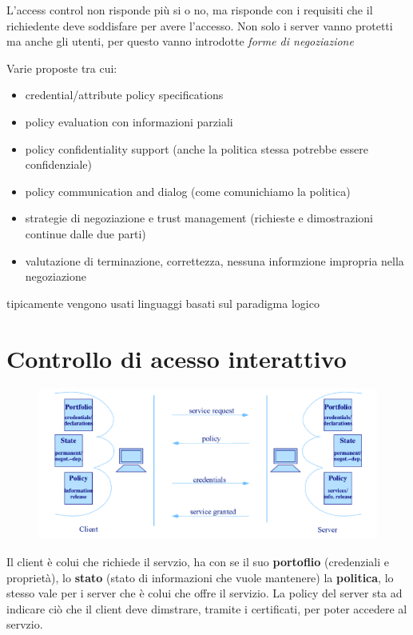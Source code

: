 \documentclass{report}
\begin{document}
L'access control non risponde più si o no, ma risponde con i requisiti che il richiedente deve soddisfare per avere l'accesso.
Non solo i server vanno protetti ma anche gli utenti, per questo vanno introdotte \textit{forme di negoziazione}

Varie proposte tra cui:
\begin{itemize}
    \item credential/attribute policy specifications
    \item policy evaluation con informazioni parziali
    \item policy confidentiality support (anche la politica stessa potrebbe essere confidenziale)
    \item policy communication and dialog (come comunichiamo la politica)
    \item strategie di negoziazione e trust management (richieste e dimostrazioni continue dalle due parti)
    \item valutazione di terminazione, correttezza, nessuna informzione impropria nella negoziazione
\end{itemize}
tipicamente vengono usati linguaggi basati sul paradigma logico

\section{Controllo di acesso interattivo}
\begin{figure}[ht]
    \centering
    \includegraphics[width=1\linewidth]{images/interactive access control 1.png}
\end{figure}

Il client è colui che richiede il servzio, ha con se il suo \textbf{portoflio} (credenziali e proprietà), lo \textbf{stato}
(stato di informazioni che vuole mantenere) la \textbf{politica}, lo stesso vale per i server che è colui che offre il servizio.
La policy del server sta ad indicare ciò che il client deve dimstrare, tramite i certificati, per poter accedere al servzio.
\end{document}
